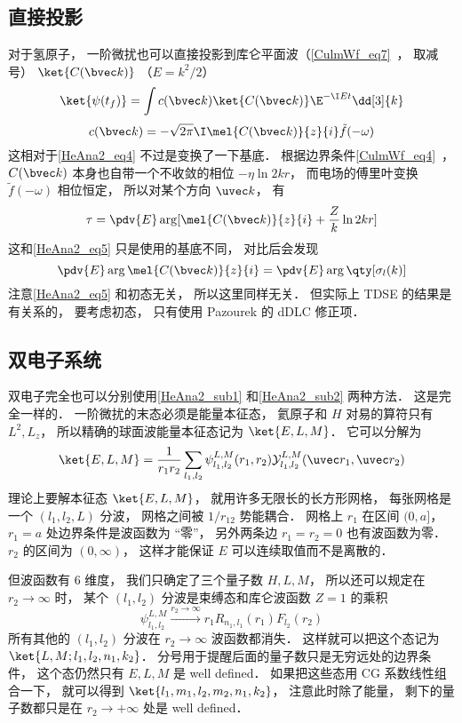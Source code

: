 \subsection{直接投影}\label{HeAna2_sub2}
对于氢原子， 一阶微扰也可以直接投影到库仑平面波（\autoref{CulmWf_eq7}~， 取减号） $\ket{C(\bvec k)}$ （$E = k^2/2$）
\begin{equation}
\ket{\psi(t_f)} = \int c(\bvec k)\ket{C(\bvec k)} \E^{-\I E t} \dd[3]{k}
\end{equation}
\begin{equation}
c(\bvec k) = -\sqrt{2\pi}\I\mel{C(\bvec k)}{z}{i} \tilde f(-\omega)
\end{equation}
这相对于\autoref{HeAna2_eq4} 不过是变换了一下基底． 根据边界条件\autoref{CulmWf_eq4}~， $C(\bvec k)$ 本身也自带一个不收敛的相位 $-\eta \ln 2kr$， 而电场的傅里叶变换 $\tilde f(-\omega)$ 相位恒定， 所以对某个方向 $\uvec k$， 有
\begin{equation}
\tau = \pdv{E} \arg[\mel{C(\bvec k)}{z}{i} + \frac{Z}{k}\ln 2kr]
\end{equation}
这和\autoref{HeAna2_eq5} 只是使用的基底不同， 对比后会发现
\begin{equation}
\pdv{E} \arg\mel{C(\bvec k)}{z}{i} = \pdv{E} \arg\qty[\sigma_l(k)]
\end{equation}
注意\autoref{HeAna2_eq5} 和初态无关， 所以这里同样无关． 但实际上 TDSE 的结果是有关系的， 要考虑初态， 只有使用 Pazourek 的 dDLC 修正项．

\subsection{双电子系统}
双电子完全也可以分别使用\autoref{HeAna2_sub1} 和\autoref{HeAna2_sub2} 两种方法． 这是完全一样的． 一阶微扰的末态必须是能量本征态， 氦原子和 $H$ 对易的算符只有 $L^2, L_z$， 所以精确的球面波能量本征态记为 $\ket{E,L,M}$． 它可以分解为
\begin{equation}
\ket{E,L,M} = \frac{1}{r_1r_2}\sum_{l_1,l_2}\psi_{l_1,l_2}^{L, M}(r_1, r_2)\mathcal Y_{l_1,l_2}^{L, M}(\uvec r_1, \uvec r_2)
\end{equation}
理论上要解本征态 $\ket{E,L,M}$， 就用许多无限长的长方形网格， 每张网格是一个 $(l_1,l_2,L)$ 分波， 网格之间被 $1/r_{12}$ 势能耦合． 网格上 $r_1$ 在区间 $(0,a]$， $r_1 = a$ 处边界条件是波函数为 “零”， 另外两条边 $r_1 = r_2 = 0$ 也有波函数为零． $r_2$ 的区间为 $(0,\infty)$， 这样才能保证 $E$ 可以连续取值而不是离散的．

但波函数有 6 维度， 我们只确定了三个量子数 $H,L,M$， 所以还可以规定在 $r_2\to\infty$ 时， 某个 $(l_1,l_2)$ 分波是束缚态和库仑波函数 $Z=1$ 的乘积
\begin{equation}
\psi_{l_1,l_2}^{L, M} \overset{r_2\to\infty}{\longrightarrow} r_1 R_{n_1,l_1}(r_1) F_{l_2}(r_2)
\end{equation}
所有其他的 $(l_1,l_2)$ 分波在 $r_2\to\infty$ 波函数都消失． 这样就可以把这个态记为 $\ket{L,M; l_1,l_2, n_1, k_2}$． 分号用于提醒后面的量子数只是无穷远处的边界条件， 这个态仍然只有 $E,L,M$ 是 well defined． 如果把这些态用 CG 系数线性组合一下， 就可以得到 $\ket{l_1, m_1, l_2,m_2,n_1,k_2}$， 注意此时除了能量， 剩下的量子数都只是在 $r_2\to+\infty$ 处是 well defined．

